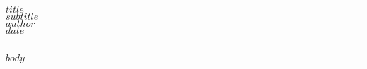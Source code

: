 \documentclass[a4paper,11pt]{article}
\begin{document}
\begin{titlepage}
    \begin{center}
        \vfill
        {\Huge \textcolor[HTML]{364e5e}{$title$}} \\  %
        {\LARGE $subtitle$} \\
        \vfill
        {\Large $author$} \\
        \vfill
        {\Large $date$}  %
        \vfill
        \noindent\rule{\textwidth}{2pt}  %
    \end{center}
\end{titlepage}

$body$
\end{document}

